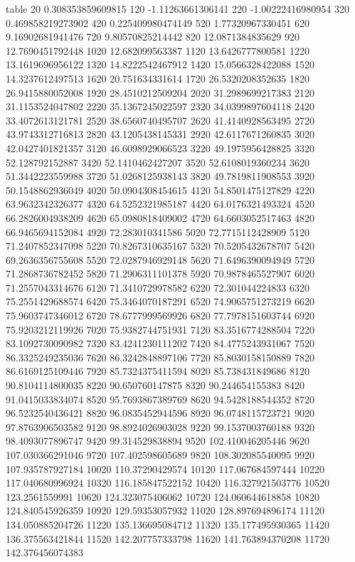 table {%
20 0.308353859609815
120 -1.11263661306141
220 -1.00222416980954
320 0.469858219273902
420 0.225409980474149
520 1.77320967330451
620 9.16902681941476
720 9.80570825214442
820 12.0871384835629
920 12.7690451792448
1020 12.682099563387
1120 13.6426777800581
1220 13.1619696956122
1320 14.8222542467912
1420 15.0566328422088
1520 14.3237612497513
1620 20.751634331614
1720 26.5320208352635
1820 26.9415880052008
1920 28.4510212509204
2020 31.2989699217383
2120 31.1153524047802
2220 35.1367245022597
2320 34.0399897604118
2420 33.4072613121781
2520 38.6560740495707
2620 41.4140928563495
2720 43.9743312716813
2820 43.1205438145331
2920 42.6117671260835
3020 42.0427401821357
3120 46.6098929066523
3220 49.1975956428825
3320 52.128792152887
3420 52.1410462427207
3520 52.6108019360234
3620 51.3442223559988
3720 51.0268125938143
3820 49.7819811908553
3920 50.1548862936049
4020 50.0904308454615
4120 54.8501475127829
4220 63.9632342326377
4320 64.5252321985187
4420 64.0176321493324
4520 66.2826004938209
4620 65.0980818409002
4720 64.6603052517463
4820 66.9465694152084
4920 72.283010341586
5020 72.7715112428909
5120 71.2407852347098
5220 70.8267310635167
5320 70.5205432678707
5420 69.2636356755608
5520 72.0287946929148
5620 71.6496390094949
5720 71.2868736782452
5820 71.2906311101378
5920 70.9878465527907
6020 71.2557043314676
6120 71.3410729978582
6220 72.301044224833
6320 75.2551429688574
6420 75.3464070187291
6520 74.9065751273219
6620 75.9603747346012
6720 78.6777999569926
6820 77.7978151603744
6920 75.9203212119926
7020 75.9382744751931
7120 83.3516774288504
7220 83.1092730090982
7320 83.4241230111202
7420 84.4775243931067
7520 86.3325249235036
7620 86.3242848897106
7720 85.8030158150889
7820 86.6169125109446
7920 85.7324375411594
8020 85.738431849686
8120 90.8104114800035
8220 90.650760147875
8320 90.244654155383
8420 91.0415033834074
8520 95.7693867389769
8620 94.5428188544352
8720 96.5232540436421
8820 96.0835452944596
8920 96.0748115723721
9020 97.8763906503582
9120 98.8924026903028
9220 99.1537003760188
9320 98.4093077896747
9420 99.314529838894
9520 102.410046205446
9620 107.030366291046
9720 107.402598605689
9820 108.302085540095
9920 107.935787927184
10020 110.37290429574
10120 117.067684597444
10220 117.040680996924
10320 116.185847522152
10420 116.327921503776
10520 123.2561559991
10620 124.323075406062
10720 124.060644618858
10820 124.840545926359
10920 129.59353057932
11020 128.897694896174
11120 134.050885204726
11220 135.136695084712
11320 135.177495930365
11420 136.375563421844
11520 142.207757333798
11620 141.763894370208
11720 142.376456074383
}

